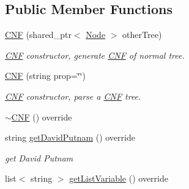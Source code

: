 \subsection*{Public Member Functions}
\begin{DoxyCompactItemize}
\item 
\hyperlink{class_c_n_f_af775e3be36e475027355d21e9ba43166}{C\+NF} (shared\+\_\+ptr$<$ \hyperlink{class_node}{Node} $>$ other\+Tree)
\begin{DoxyCompactList}\small\item\em \hyperlink{class_c_n_f}{C\+NF} constructor, generate \hyperlink{class_c_n_f}{C\+NF} of normal tree. \end{DoxyCompactList}\item 
\hyperlink{class_c_n_f_acb13869409764d8abbea2e50910fd7bc}{C\+NF} (string prop=\char`\"{}\char`\"{})
\begin{DoxyCompactList}\small\item\em \hyperlink{class_c_n_f}{C\+NF} constructor, parse a \hyperlink{class_c_n_f}{C\+NF} tree. \end{DoxyCompactList}\item 
\hyperlink{class_c_n_f_a7bce39709f41a431d486f988b32646de}{$\sim$\+C\+NF} () override
\item 
string \hyperlink{class_c_n_f_a029535415f1d5cf92c8023693ce7b40e}{get\+David\+Putnam} () override
\begin{DoxyCompactList}\small\item\em get David Putnam \end{DoxyCompactList}\item 
list$<$ string $>$ \hyperlink{class_c_n_f_abb762bfe4bc7bbccda81f8db332bafe3}{get\+List\+Variable} () override
\end{DoxyCompactItemize}
